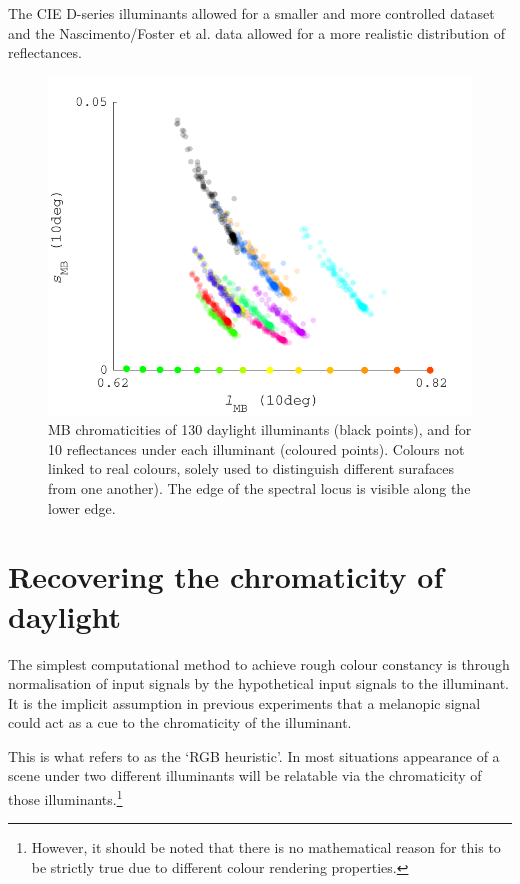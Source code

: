 The CIE D-series illuminants allowed for a smaller and more controlled dataset and the Nascimento/Foster et al. data allowed for a more realistic distribution of reflectances.

\begin{figure}[htbp]
    \includegraphics[max width=\textwidth]{figs/comp/predictingChromaticity/BasicMB_2.pdf}
    \caption{\gls{MB} chromaticities of 130 daylight illuminants (black points), and for 10 reflectances under each illuminant (coloured points). Colours not linked to real colours, solely used to distinguish different surafaces from one another). The edge of the spectral locus is visible along the lower edge.}
    \label{fig:MB}
\end{figure} 


\section{Recovering the chromaticity of daylight}

The simplest computational method to achieve rough colour constancy is through normalisation of input signals by the hypothetical input signals to the illuminant. It is the implicit assumption in previous experiments that a melanopic signal could act as a cue to the chromaticity of the illuminant.

This is what \citet{maloney_physics-based_2001} refers to as the `RGB heuristic'. In most situations appearance of a scene under two different illuminants will be relatable via the chromaticity of those illuminants.\footnote{However, it should be noted that there is no mathematical reason for this to be strictly true due to different colour rendering properties.}

